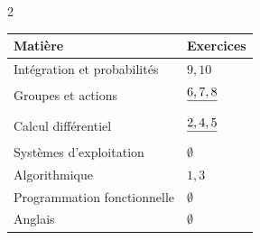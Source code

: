 \documentclass{article}
\begin{document}
\setlength{\columnsep}{2cm}

\begin{paracol}{2}

\renewcommand{\arraystretch}{1.3}
\noindent
\begin{tabular}{|p{}|>{\centering\arraybackslash}p{}|}
\hline
\rowcolor[RGB]{230,237,247}
\textbf{Matière} & \textbf{Exercices} \\
\hline
Intégration et probabilités & $9,10$\\
\hline
Groupes et actions & $\sout{6,7,8}$\\
\hline
Calcul différentiel & $\sout{2,4,5}$\\
\hline
Systèmes d'exploitation & $\emptyset$\\
\hline
Algorithmique & $1,3$\\
\hline
Programmation fonctionnelle & $\emptyset$\\
\hline
Anglais & $\emptyset$\\
\hline
\end{tabular}


\end{paracol}
\end{document}
